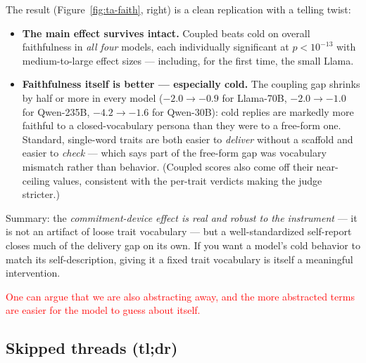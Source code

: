 \documentclass[11pt]{article}
\begin{document}
The result (Figure~\ref{fig:ta-faith}, right) is a clean replication with a
telling twist:

\begin{itemize}
  \item \textbf{The main effect survives intact.} Coupled beats cold on
        overall faithfulness in \emph{all four} models, each individually
        significant at $p < 10^{-13}$ with medium-to-large effect sizes ---
        including, for the first time, the small Llama.
  \item \textbf{Faithfulness itself is better --- especially cold.} The
        coupling gap shrinks by half or more in every model ($-2.0 \to -0.9$
        for Llama-70B, $-2.0 \to -1.0$ for Qwen-235B, $-4.2 \to -1.6$ for
        Qwen-30B): cold replies are markedly more faithful to a
        closed-vocabulary persona than they were to a free-form one. Standard,
        single-word traits are both easier to \emph{deliver} without a
        scaffold and easier to \emph{check} --- which says part of the
        free-form gap was vocabulary mismatch rather than behavior.
        (Coupled scores also come off their near-ceiling values, consistent
        with the per-trait verdicts making the judge stricter.)
\end{itemize}

Summary: the \emph{commitment-device
effect is real and robust to the instrument} --- it is not an artifact of
loose trait vocabulary --- but a well-standardized self-report closes much of
the delivery gap on its own. If you want a model's cold behavior to match its
self-description, giving it a fixed trait vocabulary is itself a meaningful
intervention.

\textcolor{red}{One can argue that we are also abstracting away, and the more abstracted terms are easier for the model to guess about itself.}

\subsection{Skipped threads (tl;dr)}
\end{document}
